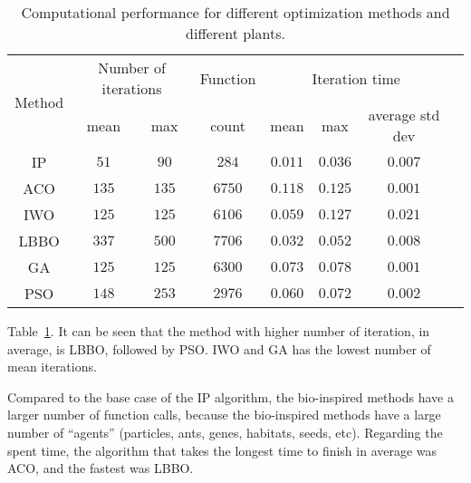 \begin{table}[tb]%
	\centering
	\caption{Computational performance for different optimization methods and different plants.}\vspace{1mm}
	\begin{tabular}{cccccccc}
		\toprule
		\multirow{2}{*}{Method} & \multicolumn{2}{c}{Number of iterations}& Function & \multicolumn{3}{c}{Iteration time}\\
		\cline{2-3} \cline{5-7}
		& mean & max & count & mean & max & average std dev\\
		\midrule
		IP & $51$ & $90$ & $284$ & $0.011$ & $0.036$ & $0.007$ \\
		ACO & $135$ & $135$ & $6750$ & $0.118$ & $0.125$ & $0.001$\\
		IWO & $125$ & $125$ & $6106$ & $0.059$ & $0.127$ & $0.021$\\
		LBBO & $337$ & $500$ & $7706$ & $0.032$ & $0.052$ & $0.008$\\
		GA & $125$ & $125$ & $6300$ & $0.073$ & $0.078$ & $0.001$\\
		PSO & $148$ & $253$ & $2976$ & $0.060$ & $0.072$ & $0.002$\\
		\bottomrule 
	\end{tabular}
	\label{tab:Results01}
\end{table}
%
Table~\ref{tab:Results01}. It can be seen that the method with higher number of iteration, in average, is LBBO, followed by PSO. IWO and GA has the lowest number of mean iterations.

Compared to the base case of the IP algorithm, the bio-inspired methods have a larger number of function calls, because the bio-inspired methods have a large number of ``agents'' (particles, ants, genes, habitats, seeds, etc).
Regarding the spent time, the algorithm that takes the longest time to finish in average was ACO, and the fastest was LBBO.

